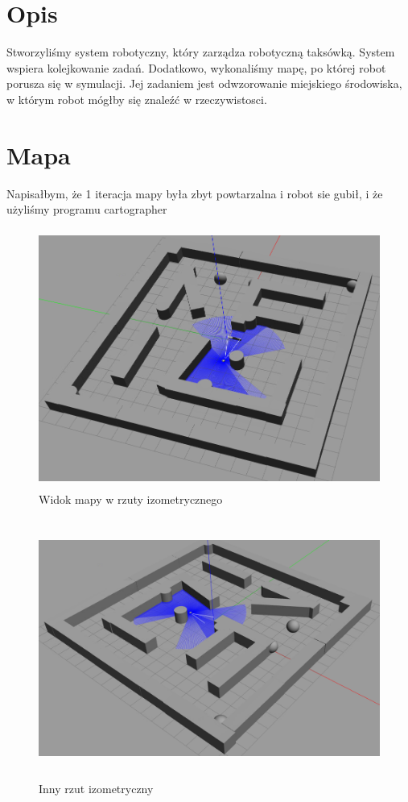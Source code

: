 \documentclass[12pt]{article}
\newcommand{\TODO}{\ensureascii{\textcolor{goldenrod}{\\ \vspace{0.1cm} \Huge TODO \\ \rule{15cm}{0.1cm}}}}
\begin{document}


\section{Opis}

Stworzyliśmy system robotyczny, który zarządza robotyczną taksówką. System wspiera kolejkowanie zadań. Dodatkowo, wykonaliśmy mapę, po której robot porusza się w symulacji. Jej zadaniem jest odwzorowanie miejskiego środowiska, w którym robot mógłby się znaleźć w rzeczywistosci. 


\clearpage\newpage
\section{Mapa}

\TODO

Napisałbym, że 1 iteracja mapy była zbyt powtarzalna i robot sie gubił, i że użyliśmy programu cartographer


\begin{figure}[!htb]
    \centering
    \includegraphics[height=8.5cm]{./images/mapa1.png}
    \caption{Widok mapy w rzuty izometrycznego}
\end{figure}


\begin{figure}[!htb]
    \centering
    \includegraphics[height=8.5cm]{./images/mapa2.png}
    \caption{Inny rzut izometryczny}
\end{figure}
\end{document}
